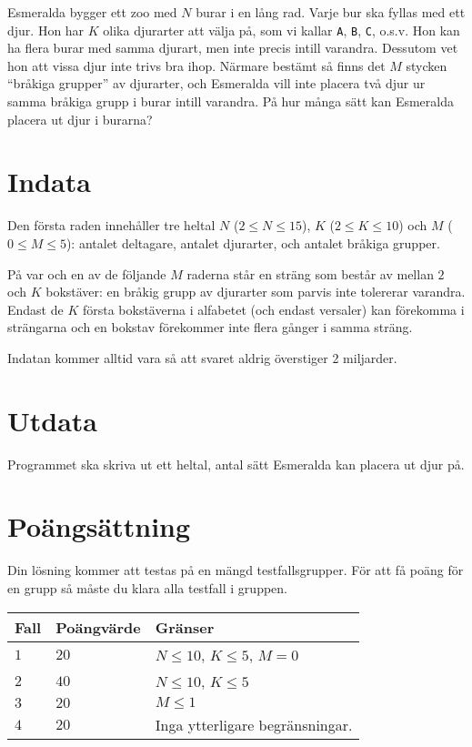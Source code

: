 Esmeralda bygger ett zoo med $N$ burar i en lång rad.
Varje bur ska fyllas med ett djur. Hon har $K$ olika djurarter att välja på, som vi kallar \texttt{A}, \texttt{B}, \texttt{C}, o.s.v. Hon kan ha flera burar med samma djurart, men inte precis intill varandra. Dessutom vet hon att vissa djur inte trivs bra ihop. Närmare bestämt så finns det $M$ stycken ``bråkiga grupper'' av djurarter, och Esmeralda vill inte placera två djur ur samma bråkiga grupp i burar intill varandra. På hur många sätt kan Esmeralda placera ut djur i burarna?

\section*{Indata}
Den första raden innehåller tre heltal $N$ ($2 \le N \le 15$), $K$ ($2 \le K \le 10$) och $M$ ($0 \le M \le 5$): antalet deltagare, antalet djurarter, och antalet bråkiga grupper.

På var och en av de följande $M$ raderna står en sträng som består av mellan $2$ och $K$ bokstäver: en bråkig grupp av djurarter som parvis inte tolererar varandra.
Endast de $K$ första bokstäverna i alfabetet (och endast versaler) kan förekomma i strängarna och en bokstav förekommer inte flera gånger i samma sträng.

Indatan kommer alltid vara så att svaret aldrig överstiger 2 miljarder.

\section*{Utdata}
Programmet ska skriva ut ett heltal, antal sätt Esmeralda kan placera ut djur på.

\section*{Poängsättning}
Din lösning kommer att testas på en mängd testfallsgrupper.
För att få poäng för en grupp så måste du klara alla testfall i gruppen.

\noindent
\begin{tabular}{| l | l | l |}
  \hline
  Fall & Poängvärde & Gränser \\ \hline
  $1$    & $20$        &  $N \le 10$, $K \le 5$, $M=0$\\ \hline 
  $2$    & $40$        &  $N \le 10$, $K \le 5$ \\ \hline
  $3$    & $20$        &  $M \le 1$ \\ \hline
  $4$    & $20$        &  Inga ytterligare begränsningar. \\ \hline
\end{tabular}

